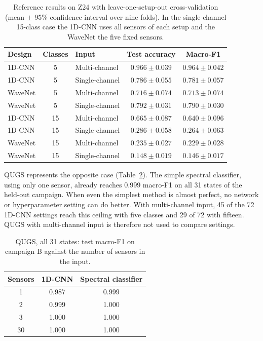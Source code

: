 \documentclass[11pt,a4paper]{article}
\begin{document}
\begin{table}[htbp]
  \centering
  \caption{Reference results on Z24 with leave-one-setup-out cross-validation (mean $\pm$ 95\% confidence interval over nine folds). In the single-channel 15-class case the 1D-CNN uses all sensors of each setup and the WaveNet the five fixed sensors.}
  \label{tab:loso}
  \small
  \begin{tabular}{@{}lcl cc@{}}
    \toprule
    Design & Classes & Input & Test accuracy & Macro-F1 \\
    \midrule
    1D-CNN  & 5  & Multi-channel  & $\mathbf{0.966\pm0.039}$ & $\mathbf{0.964\pm0.042}$ \\
    1D-CNN  & 5  & Single-channel & $0.786\pm0.055$ & $0.781\pm0.057$ \\
    WaveNet & 5  & Multi-channel  & $0.716\pm0.074$ & $0.713\pm0.074$ \\
    WaveNet & 5  & Single-channel & $0.792\pm0.031$ & $0.790\pm0.030$ \\
    1D-CNN  & 15 & Multi-channel  & $\mathbf{0.665\pm0.087}$ & $\mathbf{0.640\pm0.096}$ \\
    1D-CNN  & 15 & Single-channel & $0.286\pm0.058$ & $0.264\pm0.063$ \\
    WaveNet & 15 & Multi-channel  & $0.235\pm0.027$ & $0.229\pm0.028$ \\
    WaveNet & 15 & Single-channel & $0.148\pm0.019$ & $0.146\pm0.017$ \\
    \bottomrule
  \end{tabular}
\end{table}

QUGS represents the opposite case (Table~\ref{tab:qugs}). The simple spectral classifier, using only one sensor, already reaches 0.999 macro-F1 on all 31 states of the held-out campaign. When even the simplest method is almost perfect, no network or hyperparameter setting can do better. With multi-channel input, 45 of the 72 1D-CNN settings reach this ceiling with five classes and 29 of 72 with fifteen. QUGS with multi-channel input is therefore not used to compare settings.

\begin{table}[htbp]
  \centering
  \caption{QUGS, all 31 states: test macro-F1 on campaign B against the number of sensors in the input.}
  \label{tab:qugs}
  \small
  \begin{tabular}{@{}c cc@{}}
    \toprule
    Sensors & 1D-CNN & Spectral classifier \\
    \midrule
    1  & 0.987 & 0.999 \\
    2  & 0.999 & 1.000 \\
    3  & 1.000 & 1.000 \\
    30 & 1.000 & 1.000 \\
    \bottomrule
  \end{tabular}
\end{table}
\end{document}
